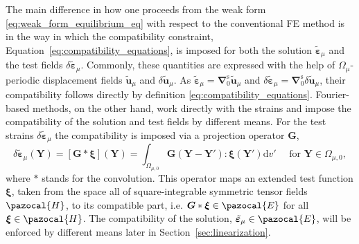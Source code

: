 The main difference in how one proceeds from the weak form \eqref{eq:weak_form_equilibrium_eq} with respect to the conventional FE method is in the way in which the compatibility constraint, Equation~\eqref{eq:compatibility_equations}, is imposed for both the solution \(\tilde{\bm\varepsilon}_\mu\) and the test fields \(\delta \tilde{\bm\varepsilon}_\mu\).
Commonly, these quantities are expressed with the help of \(\Omega_\mu\)-periodic displacement fields \(\tilde{\bm{u}}_\mu\) and \(\delta \tilde{\bm{u}}_\mu\).
As \(\tilde{\bm\varepsilon}_\mu=\bm{\nabla}_0^{\mathrm{s}} \tilde{\bm u}_\mu\) and \(\delta\tilde{\bm\varepsilon}_\mu=\bm{\nabla}_0^{\mathrm{s}} \delta\tilde{\bm u}_\mu\), their compatibility follows directly by definition \eqref{eq:compatibility_equations}.
Fourier-based methods, on the other hand, work directly with the strains and impose the compatibility of the solution and test fields by different means.
For the test strains \(\delta \tilde{\bm \varepsilon}_\mu\) the compatibility is imposed via a projection operator \(\bm{G}\),
\begin{equation} \label{eq:compatibility_of_test_functions}
\delta \tilde{\bm\varepsilon}_\mu(\bm{Y})=[\bm{G} * \bm{\xi}](\bm{Y})=\int_{\Omega_{\mu,0}} \bm{G}(\bm{Y}-\bm{Y}'): \bm{\xi}(\bm{Y}') \mathrm{d} v' \quad\text { for } \bm{Y} \in \Omega_{\mu,0},
\end{equation}
where \(*\) stands for the convolution.
This operator maps an extended test function \(\bm\xi\), taken from the space all of square-integrable symmetric tensor fields \(\pazocal{H}\), to its compatible part, i.e. \(\bm G * \bm\xi \in \pazocal{E}\) for all \(\bm\xi \in \pazocal{H}\).
The compatibility of the solution, \(\tilde{\bm\varepsilon}_\mu \in \pazocal{E}\), will be enforced by different means later in Section~\ref{sec:linearization}.

